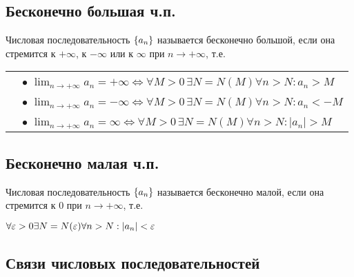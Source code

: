 \subsection{Бесконечно большая ч.п.}

{
    Числовая последовательность $ \{ a_n \} $ называется бесконечно большой, если она стремится к $ +\infty$, к $ -\infty $ или к $ \infty $ при $ n \to +\infty $, т.е.

\begin{tabular}{rl}
    & $\bullet$
        $ \lim_{n \to +\infty} a_n = +\infty \iff
        \forall M > 0 \, \exists N = N(M) \forall n > N: a_n > M $ \\
    & $\bullet$
        $ \lim_{n \to +\infty} a_n = -\infty \iff
        \forall M > 0 \, \exists N = N(M) \forall n > N: a_n < -M $ \\
    & $\bullet$
        $ \lim_{n \to +\infty} a_n = \infty \iff
        \forall M > 0 \, \exists N = N(M) \forall n > N: | a_n | > M $ \\
\end{tabular}
}

\subsection{Бесконечно малая ч.п.}

{
    Числовая последовательность $ \{ a_n \} $ называется бесконечно малой, если она стремится к 0 при $ n \to +\infty $, т.е.

    $ \forall \varepsilon > 0 \exists N = N(\varepsilon) \forall n > N: | a_n | < \varepsilon $
}

\subsection{Связи числовых последовательностей}


